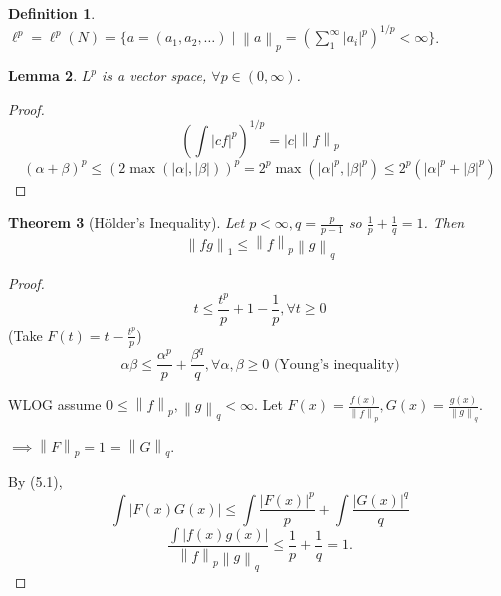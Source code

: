 \documentclass{report}
\newcommand{\norm}[1]{\left\| #1 \right\|}
\newtheorem{theorem}{Theorem}[chapter]
\newtheorem{lemma}[theorem]{Lemma}
\theoremstyle{definition}
\newtheorem{definition}[theorem]{Definition}
\theoremstyle{remark}
\begin{document}
\begin{definition}
	$\ell^p = \ell^p(N) = \{a = (a_1, a_2, \ldots) \mid \norm{a}_p = \left(\sum_{1}^\infty |a_i|^p\right)^{1 / p} < \infty\}$.
\end{definition}

\begin{lemma}
	$L^p$ is a vector space, $\forall p \in (0, \infty)$.
\end{lemma}
\begin{proof}
	\[
		\left(\int |cf|^p\right)^{1/p} = |c|\norm{f}_p
	\]
	\[
		(\alpha + \beta)^p \leq (2 \max(|\alpha|, |\beta|))^p = 2^p \max\left(|\alpha|^p, |\beta|^p\right) \leq 2^p(|\alpha|^p + |\beta|^p)	
	\]
\end{proof}

\begin{theorem}[Hölder's Inequality]
	Let $p < \infty, q = \frac{p}{p - 1}$ so $\frac{1}{p} + \frac{1}{q} = 1$. Then 
	\[
		\norm{fg}_1 \leq \norm{f}_p\norm{g}_q	
	\]
\end{theorem}
\begin{proof}
	\[
		t \leq \frac{t^p}{p} + 1 - \frac{1}{p}, \forall t \geq 0	
	\]
	(Take $F(t) = t - \frac{t^p}{p}$)
	\begin{equation}
		\alpha\beta \leq \frac{\alpha^p}{p} + \frac{\beta^q}{q}, \forall \alpha, \beta \geq 0 \text{ (Young's inequality)}
	\end{equation}
		
	WLOG assume $0 \leq \norm{f}_p, \norm{g}_q < \infty$. Let $F(x) = \frac{f(x)}{\norm{f}_p}, G(x) = \frac{g(x)}{\norm{g}_q}$.

	$\implies \norm{F}_p = 1 = \norm{G}_q$.

	By (5.1), 
	\[
		\int |F(x)G(x)| \leq \int \frac{|F(x)|^p}{p} + \int \frac{|G(x)|^q}{q}	
	\] 
	\[
		\frac{\int |f(x)g(x)|}{\norm{f}_p\norm{g}_q} \leq \frac{1}{p} + \frac{1}{q} = 1.	
	\]
\end{proof}
\end{document}
